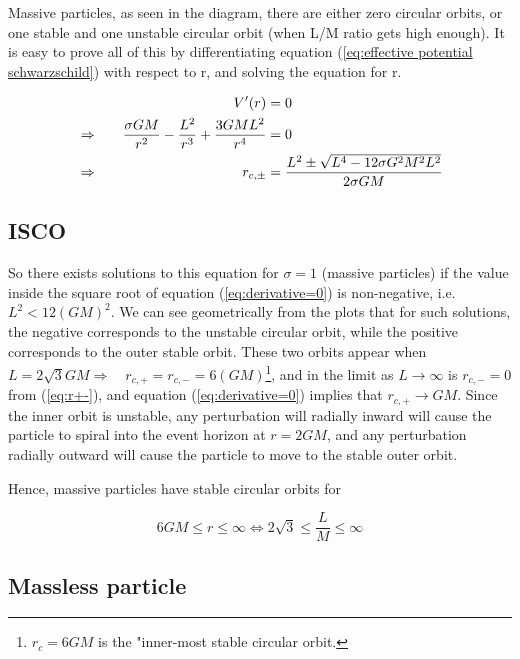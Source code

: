 Massive particles, as seen in the diagram, there are either zero circular orbits, or one stable and one unstable circular orbit (when L/M ratio gets high enough). It is easy to prove all of this by differentiating equation (\ref{eq:effective potential schwarzschild}) with respect to r, and solving the equation for r.

\begin{alignat}{2}
    &&V'(r)&=0\notag\\
    &\Rightarrow\quad
    &\frac{\sigma G M}{r^2} - \frac{L^2}{r^3} + \frac{3 G M L^2}{r^4}
    &=0 \label{eq:derivative=0}\\
    &\Rightarrow\quad 
    &r_{c,\pm}
    &=\frac{L^2 \pm \sqrt{L^4-12 \sigma G^2 M^2 L^2}}{2 \sigma G M}\label{eq:r+-}
\end{alignat}

\subsection{ISCO}\label{sec:ISCO}

So there exists solutions to this equation for $\sigma=1$ (massive particles) if the value inside the square root of equation (\ref{eq:derivative=0}) is non-negative, i.e. $L^2 < 12 (G M)^2$. We can see geometrically from the plots that for such solutions, the negative corresponds to the unstable circular orbit, while the positive corresponds to the outer stable orbit. These two orbits appear when $L=2\sqrt{3}GM \Rightarrow\quad r_{c,+}=r_{c,-}=6(GM)$\footnote{$r_c=6 GM$ is the "inner-most stable circular orbit.}, and in the limit as $L\longrightarrow \infty$ is $r_{c,-}=0$ from (\ref{eq:r+-}), and equation (\ref{eq:derivative=0}) implies that $r_{c,+}\rightarrow GM$. Since the inner orbit is unstable, any perturbation will radially inward will cause the particle to spiral into the event horizon at $r=2GM$, and any perturbation radially outward will cause the particle to move to the stable outer orbit. 

Hence, massive particles have stable circular orbits for 

\begin{equation}
    6 G M \leq r \leq \infty \iff 2\sqrt{3} \leq \frac{L}{M} \leq \infty
\end{equation}

\subsection{Massless particle}

